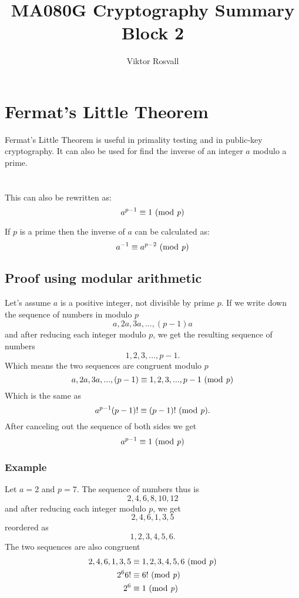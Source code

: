 \documentclass{article}
\title{MA080G Cryptography Summary Block 2}
\author{Viktor Rosvall}
\begin{document}
	\maketitle
	
	\section*{Fermat's Little Theorem} 
	Fermat's Little Theorem is useful in primality testing and in public-key cryptography. It can also be used for find the inverse of  an integer $a$ modulo a prime. \cite{fermatsummary}
	\\
	\\
	\\

	This can also be rewritten as: 
	$$
	a^{p-1} \equiv 1 \text{ (mod \textit{p})}
	$$
	
	If $p$ is a prime then the inverse of $a$ can be calculated as:
	$$
	a^{-1} \equiv a^{p-2} \text{ (mod \textit{p})}
	$$
	
 	\subsection*{Proof using modular arithmetic \cite{fermatproof}}
 	Let's assume $a$ is a positive integer, not divisible by prime $p$. If we write down the sequence of numbers in modulo $p$
 	$$
 	a,2a,3a,...,(p-1)a
 	$$
 	and after reducing each integer modulo $p$, we get the resulting sequence of numbers
 	$$
 	1,2,3,...,p-1.
 	$$
 	Which means the two sequences are congruent modulo $p$ 
 	$$
 	a,2a,3a,...,(p-1) \equiv 1,2,3,...,p-1 \text{ (mod \textit{p})}
 	$$
 	Which is the same as 
 	$$
 	a^{p-1}(p-1)! \equiv (p-1)! \text{ (mod \textit{p})}.
 	$$
 	After canceling out the sequence of both sides we get
 	$$
	a^{p-1} \equiv 1 \text{ (mod \textit{p})}
 	$$
 	
 	\subsubsection*{Example}
 	Let $a = 2$ and $ p = 7$. The sequence of numbers thus is
 	$$
 	2,4,6,8,10,12
 	$$
 	and after reducing each integer modulo $p$, we get
 	$$
 	2,4,6,1,3,5
 	$$
 	reordered as
 	$$
 	1,2,3,4,5,6.
 	$$
 	The two sequences are also congruent 
 	\[
 	\begin{split}
	 	2,4,6,1,3,5 &\equiv 1,2,3,4,5,6 \text{ (mod \textit{p})}\\
	 	2^6 6! &\equiv 6! \text{ (mod \textit{p})} \\
	 	2^6 &\equiv 1 \text{ (mod \textit{p})}
 	\end{split}
 	\]
 	
\end{document}
